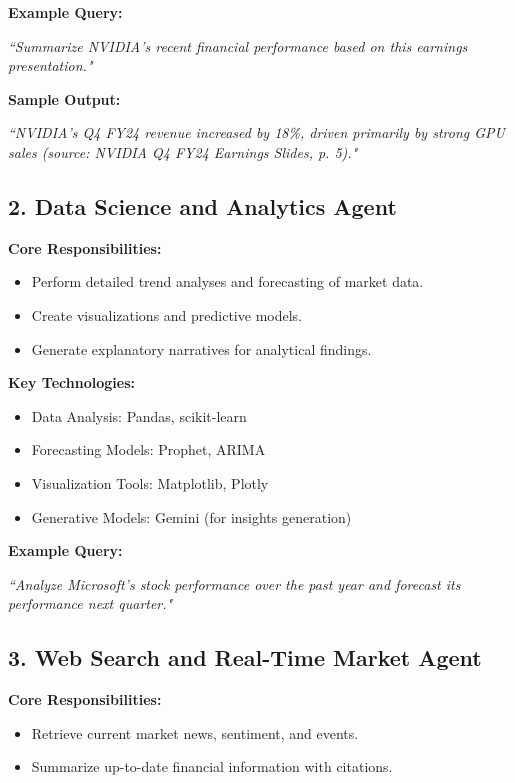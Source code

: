 \documentclass[12pt]{article}
\begin{document}
\textbf{Example Query:}

\textit{``Summarize NVIDIA’s recent financial performance based on this earnings presentation."}

\textbf{Sample Output:}

\textit{``NVIDIA’s Q4 FY24 revenue increased by 18\%, driven primarily by strong GPU sales (source: NVIDIA Q4 FY24 Earnings Slides, p. 5)."}

\subsection*{2. Data Science and Analytics Agent}

\textbf{Core Responsibilities:}
\begin{itemize}[noitemsep]
    \item Perform detailed trend analyses and forecasting of market data.
    \item Create visualizations and predictive models.
    \item Generate explanatory narratives for analytical findings.
\end{itemize}

\textbf{Key Technologies:}
\begin{itemize}[noitemsep]
    \item Data Analysis: Pandas, scikit-learn
    \item Forecasting Models: Prophet, ARIMA
    \item Visualization Tools: Matplotlib, Plotly
    \item Generative Models: Gemini (for insights generation)
\end{itemize}

\textbf{Example Query:}

\textit{``Analyze Microsoft's stock performance over the past year and forecast its performance next quarter."}

\subsection*{3. Web Search and Real-Time Market Agent}

\textbf{Core Responsibilities:}
\begin{itemize}[noitemsep]
    \item Retrieve current market news, sentiment, and events.
    \item Summarize up-to-date financial information with citations.
\end{itemize}
\end{document}
